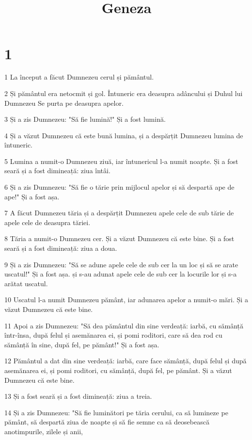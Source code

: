 

\title{Geneza}

\chapter{1}

\par 1 La început a făcut Dumnezeu cerul și pământul.
\par 2 Și pământul era netocmit și gol. Întuneric era deasupra adâncului și Duhul lui Dumnezeu Se purta pe deasupra apelor.
\par 3 Și a zis Dumnezeu: "Să fie lumină!" Și a fost lumină.
\par 4 Și a văzut Dumnezeu că este bună lumina, și a despărțit Dumnezeu lumina de întuneric.
\par 5 Lumina a numit-o Dumnezeu ziuă, iar întunericul l-a numit noapte. Și a fost seară și a fost dimineață: ziua întâi.
\par 6 Și a zis Dumnezeu: "Să fie o tărie prin mijlocul apelor și să despartă ape de ape!" Și a fost așa.
\par 7 A făcut Dumnezeu tăria și a despărțit Dumnezeu apele cele de sub tărie de apele cele de deasupra tăriei.
\par 8 Tăria a numit-o Dumnezeu cer. Și a văzut Dumnezeu că este bine. Și a fost seară și a fost dimineață: ziua a doua.
\par 9 Și a zis Dumnezeu: "Să se adune apele cele de sub cer la un loc și să se arate uscatul!" Și a fost așa. și s-au adunat apele cele de sub cer la locurile lor și s-a arătat uscatul.
\par 10 Uscatul l-a numit Dumnezeu pământ, iar adunarea apelor a numit-o mări. Și a văzut Dumnezeu că este bine.
\par 11 Apoi a zis Dumnezeu: "Să dea pământul din sine verdeață: iarbă, cu sămânță într-însa, după felul și asemănarea ei, și pomi roditori, care să dea rod cu sămânță în sine, după fel, pe pământ!" Și a fost așa.
\par 12 Pământul a dat din sine verdeață: iarbă, care face sămânță, după felul și după asemănarea ei, și pomi roditori, cu sămânță, după fel, pe pământ. Și a văzut Dumnezeu că este bine.
\par 13 Și a fost seară și a fost dimineață: ziua a treia.
\par 14 Și a zis Dumnezeu: "Să fie luminători pe tăria cerului, ca să lumineze pe pământ, să despartă ziua de noapte și să fie semne ca să deosebească anotimpurile, zilele și anii,
